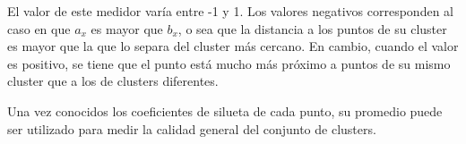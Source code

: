 El valor de este medidor varía entre -1 y 1.
Los valores negativos corresponden al caso en que $a_x$ es mayor que $b_x$, o sea que la distancia a los puntos de su cluster es mayor que la que lo separa del cluster más cercano.
En cambio, cuando el valor es positivo, se tiene que el punto está mucho más próximo a puntos de su mismo cluster que a los de clusters diferentes.

Una vez conocidos los coeficientes de silueta de cada punto, su promedio puede ser utilizado para medir la calidad general del conjunto de clusters.

